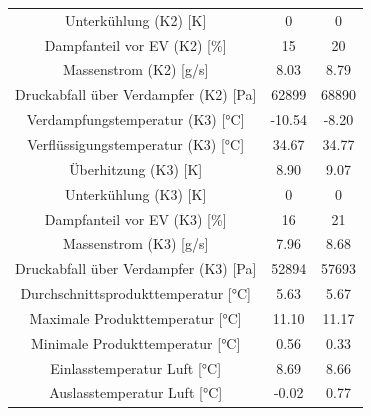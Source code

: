 \begin{table}[h!]
\begin{tabular}{|ccc|}
\multicolumn{1}{|c|}{Unterkühlung (K2) {[}K{]}}                 & \multicolumn{1}{c|}{0}      & 0                 \\
\multicolumn{1}{|c|}{Dampfanteil vor EV (K2) {[}\%{]}}          & \multicolumn{1}{c|}{15}     & 20                \\
\multicolumn{1}{|c|}{Massenstrom (K2) {[}g/s{]}}                & \multicolumn{1}{c|}{8.03}   & 8.79              \\
\multicolumn{1}{|c|}{Druckabfall über Verdampfer (K2) {[}Pa{]}} & \multicolumn{1}{c|}{62899}  & 68890             \\ \hline
\multicolumn{1}{|c|}{Verdampfungstemperatur (K3) {[}°C{]}}      & \multicolumn{1}{c|}{-10.54} & -8.20             \\
\multicolumn{1}{|c|}{Verflüssigungstemperatur (K3) {[}°C{]}}    & \multicolumn{1}{c|}{34.67}  & 34.77             \\
\multicolumn{1}{|c|}{Überhitzung (K3) {[}K{]}}                  & \multicolumn{1}{c|}{8.90}   & 9.07              \\
\multicolumn{1}{|c|}{Unterkühlung (K3) {[}K{]}}                 & \multicolumn{1}{c|}{0}      & 0                 \\
\multicolumn{1}{|c|}{Dampfanteil vor EV (K3) {[}\%{]}}          & \multicolumn{1}{c|}{16}     & 21                \\
\multicolumn{1}{|c|}{Massenstrom (K3) {[}g/s{]}}                & \multicolumn{1}{c|}{7.96}   & 8.68              \\
\multicolumn{1}{|c|}{Druckabfall über Verdampfer (K3) {[}Pa{]}} & \multicolumn{1}{c|}{52894}  & 57693             \\ \hline
\multicolumn{1}{|c|}{Durchschnittsprodukttemperatur {[}°C{]}}   & \multicolumn{1}{c|}{5.63}   & 5.67              \\
\multicolumn{1}{|c|}{Maximale Produkttemperatur {[}°C{]}}       & \multicolumn{1}{c|}{11.10}  & 11.17             \\
\multicolumn{1}{|c|}{Minimale Produkttemperatur {[}°C{]}}       & \multicolumn{1}{c|}{0.56}   & 0.33              \\
\multicolumn{1}{|c|}{Einlasstemperatur Luft {[}°C{]}}           & \multicolumn{1}{c|}{8.69}   & 8.66              \\
\multicolumn{1}{|c|}{Auslasstemperatur Luft {[}°C{]}}           & \multicolumn{1}{c|}{-0.02}  & 0.77              \\ \hline
\end{tabular}
\end{table}















